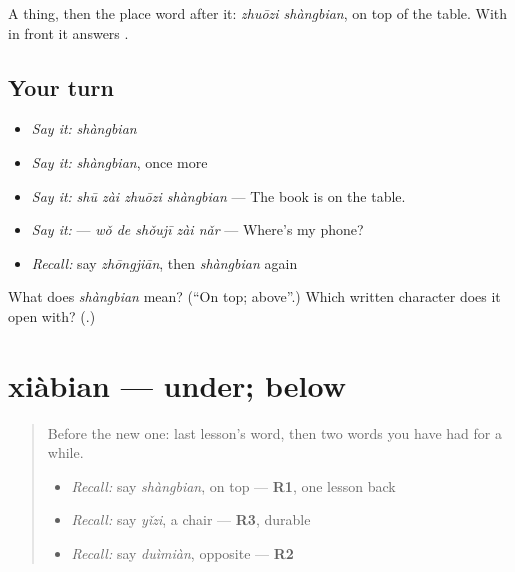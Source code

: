 \begin{grammarlens}[title={What you've built}]
A thing, then the place word after it: \emph{zhuōzi shàngbian}, on top of the table. With  in front it answers .
\end{grammarlens}

\subsection*{Your turn}
\begin{itemize}
\raggedright
  \item \emph{Say it:} \emph{shàngbian}
  \item \emph{Say it:} \emph{shàngbian}, once more
  \item \emph{Say it:} \emph{shū zài zhuōzi shàngbian} — The book is on the table.
  \item \emph{Say it:}  — \emph{wǒ de shǒujī zài nǎr} — Where's my phone?
  \item \emph{Recall:} say \emph{zhōngjiān}, then \emph{shàngbian} again
\end{itemize}

\begin{tcolorbox}[breakable,colback=teal!4,colframe=teal!35!black,title={Before you move on}]
What does \emph{shàngbian} mean? (\textquotedblleft{}On top; above\textquotedblright{}.) Which written character does it open with? (\textbf{}.)
\end{tcolorbox}
\section[xiàbian]{xiàbian — under; below}

\label{lesson:ZH-C86-xiabian}



\begin{quote}
Before the new one: last lesson's word, then two words you have had for a while.

\begin{itemize}
\raggedright
  \item \emph{Recall:} say \emph{shàngbian}, on top — \textbf{R1}, one lesson back
  \item \emph{Recall:} say \emph{yǐzi}, a chair — \textbf{R3}, durable
  \item \emph{Recall:} say \emph{duìmiàn}, opposite — \textbf{R2}
\end{itemize}
\end{quote}

